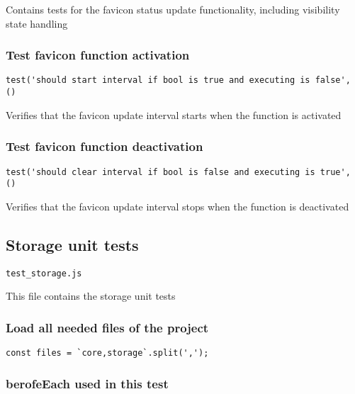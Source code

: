 \documentclass[a4paper]{article}
\begin{document}
Contains tests for the favicon status update functionality,
including visibility state handling

\hypertarget{toc253}{}
\subsubsection{Test favicon function activation}

\begin{lstlisting}
test('should start interval if bool is true and executing is false', ()
\end{lstlisting}

Verifies that the favicon update interval starts when
the function is activated

\hypertarget{toc254}{}
\subsubsection{Test favicon function deactivation}

\begin{lstlisting}
test('should clear interval if bool is false and executing is true', ()
\end{lstlisting}

Verifies that the favicon update interval stops when
the function is deactivated

\hypertarget{toc255}{}
\subsection{Storage unit tests}

\begin{lstlisting}
test_storage.js
\end{lstlisting}

This file contains the storage unit tests

\hypertarget{toc256}{}
\subsubsection{Load all needed files of the project}

\begin{lstlisting}
const files = `core,storage`.split(',');
\end{lstlisting}

\hypertarget{toc257}{}
\subsubsection{berofeEach used in this test}
\end{document}
